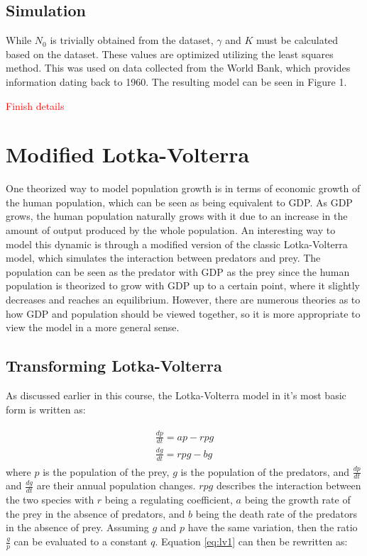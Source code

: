 \documentclass[a4paper]{article}
\newcommand{\todo}[1]{{\Large\textcolor{red}{#1}}}
\begin{document}
\subsection{Simulation}

While $N_0$ is trivially obtained from the dataset, $\gamma$ and $K$ must be calculated based on the dataset. These values are optimized utilizing the least squares method. This was used on data collected from the World Bank, which provides information dating back to 1960. The resulting model can be seen in Figure 1.


\todo{Finish details}

\section{Modified Lotka-Volterra}

One theorized way to model population growth is in terms of economic growth of the human population, which can be seen as being equivalent to GDP. As GDP grows, the human population naturally grows with it due to an increase in the amount of output produced by the whole population. An interesting way to model this dynamic is through a modified version of the classic Lotka-Volterra model, which simulates the interaction between predators and prey. The population can be seen as the predator with GDP as the prey since the human population is theorized to grow with GDP up to a certain point, where it slightly decreases and reaches an equilibrium. However, there are numerous theories as to how GDP and population should be viewed together, so it is more appropriate to view the model in a more general sense. 

\subsection{Transforming Lotka-Volterra}

As discussed earlier in this course, the Lotka-Volterra model in it's most basic form is written as:

\begin{align}
\begin{split}
\label{eq:lv1}
	\frac{dp}{dt} = ap - rpg \\
	\frac{dg}{dt} = rpg - bg
\end{split}
\end{align}
where $p$ is the population of the prey, $g$ is the population of the predators, and $\frac{dp}{dt}$ and $\frac{dg}{dt}$ are their annual population changes. $rpg$ describes the interaction between the two species with $r$ being a regulating coefficient, $a$ being the growth rate of the prey in the absence of predators, and $b$ being the death rate of the predators in the absence of prey. Assuming $g$ and $p$ have the same variation, then the ratio $\frac{g}{p}$ can be evaluated to a constant ${q}$. Equation \ref{eq:lv1} can then be rewritten as:
\end{document}
